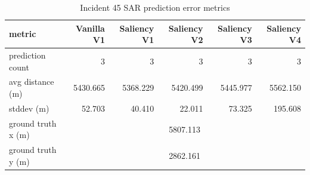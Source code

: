 \begin{table}[ht]
\centering
\caption{Incident 45 SAR prediction error metrics}
\label{tab:sar-incident-45}
\begin{tabular}{lrrrrr}
\hline
metric & Vanilla V1 & Saliency V1 & Saliency V2 & Saliency V3 & Saliency V4 \\
\hline
prediction count & 3 & 3 & 3 & 3 & 3 \\
avg distance (m) & 5430.665 & 5368.229 & 5420.499 & 5445.977 & 5562.150 \\
stddev (m) & 52.703 & 40.410 & 22.011 & 73.325 & 195.608 \\
ground truth x (m) & \multicolumn{5}{c}{5807.113} \\
ground truth y (m) & \multicolumn{5}{c}{2862.161} \\
\hline
\end{tabular}
\end{table}

